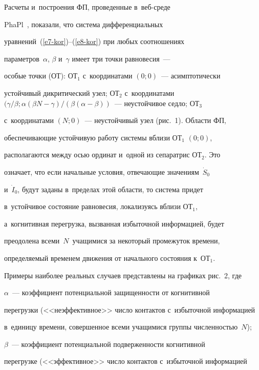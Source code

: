   


  Расчеты и~построения ФП, проведенные в~веб-сре\-де  


PhaPl~\cite{7-kor, 8-kor}, показали, что система дифференциальных 


уравнений~(\ref{e7-kor})--(\ref{e8-kor}) при любых соотношениях 


па\-ра\-мет\-ров~$\alpha$, $\beta$ и~$\gamma$ имеет три точки равновесия~--- 


особые точки (ОТ): ОТ$_1$ с~координатами $(0; 0)$~--- асимптотически 


устойчивый дикритический узел; ОТ$_2$ с~координатами $(\gamma/\beta; 


\alpha(\beta N-\gamma)/(\beta(\alpha-\beta))$~--- неустойчивое седло; ОТ$_3$ 


с~координатами $(N; 0)$~--- неустойчивый узел (рис.~1). Области ФП, 


обеспечивающие устой\-чи\-вую работу сис\-те\-мы вблизи ОТ$_1$ $(0; 0)$, 


располагаются между осью ординат и~одной из сепаратрис ОТ$_2$. Это 


означает, что если начальные условия, от\-ве\-ча\-ющие значениям~$\dot{S}_0$ 


и~$\dot{I}_0$, будут заданы в~пределах этой об\-ласти, то сис\-те\-ма придет 


в~устойчивое со\-сто\-яние равновесия, локализуясь вбли\-зи ОТ$_1$, 


а~когнитивная перегрузка, вызванная избыточной информацией, будет 


преодолена всеми~$N$~учащимися за некоторый промежуток времени, 


опре\-де\-ля\-емый временем движения от начального со\-сто\-яния к~ОТ$_1$. 


 


 Примеры наиболее реальных случаев представлены на графиках рис.~2, где 


$\alpha$~--- коэффициент потенциальной за\-щи\-щен\-ности от когнитивной 


перегрузки (<<неэффективное>> чис\-ло контактов с~избыточной информацией 


в~единицу времени, совершенное всеми учащимися группы чис\-лен\-ностью~$N$); 


$\beta$~--- коэффициент потенциальной под\-вер\-жен\-ности когнитивной 


перегрузке (<<эффективное>> чис\-ло контактов с~избыточной информацией 


